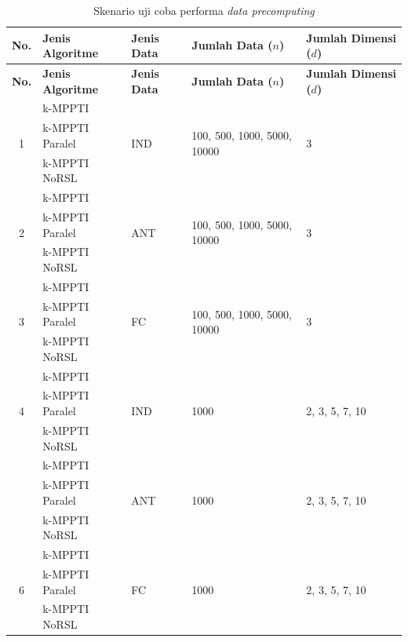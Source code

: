 \begin{longtable}{| c | p{3cm} | p{1cm} | p{2.5cm} | p{1.5cm} |}
	\caption{Skenario uji coba performa \textit{data precomputing} \label{tab:uji-coba-performa-precompute}}\\
	\hline
	\textbf{No.} & \textbf{Jenis Algoritme} & \textbf{Jenis Data} & \textbf{Jumlah Data ($n$)} & \textbf{Jumlah Dimensi ($d$)} \\ \hline
	\endfirsthead
	\hline
	\textbf{No.} & \textbf{Jenis Algoritme} & \textbf{Jenis Data} & \textbf{Jumlah Data ($n$)} & \textbf{Jumlah Dimensi ($d$)} \\ \hline
	\endhead
	\multirow{3}{*}{1} & k-MPPTI & \multirow{3}{1cm}{IND} & \multirow{3}{2.5cm}{100, 500, 1000, 5000, 10000} & \multirow{3}{1.5cm}{3} \\ \cline{2-2} \nopagebreak
	& k-MPPTI Paralel & & & \\ \cline{2-2} \nopagebreak
	& k-MPPTI NoRSL & & & \\ \hline
	\multirow{3}{*}{2} & k-MPPTI & \multirow{3}{1cm}{ANT} & \multirow{3}{2.5cm}{100, 500, 1000, 5000, 10000} & \multirow{3}{1.5cm}{3}\\ \cline{2-2} \nopagebreak
	& k-MPPTI Paralel & & & \\ \cline{2-2} \nopagebreak
	& k-MPPTI NoRSL & & & \\ \hline
	\multirow{3}{*}{3} & k-MPPTI & \multirow{3}{1cm}{FC} & \multirow{3}{2.5cm}{100, 500, 1000, 5000, 10000} & \multirow{3}{1.5cm}{3}\\ \cline{2-2} \nopagebreak
	& k-MPPTI Paralel & & & \\ \cline{2-2} \nopagebreak
	& k-MPPTI NoRSL & & & \\ \hline 
	\multirow{3}{*}{4} & k-MPPTI & \multirow{3}{1cm}{IND} & \multirow{3}{2.5cm}{1000} & \multirow{3}{1.5cm}{2, 3, 5, 7, 10}\\ \cline{2-2}	\nopagebreak	
	& k-MPPTI Paralel & & & \\ \cline{2-2} \nopagebreak
	& k-MPPTI NoRSL & & & \\ \hline \pagebreak
	\multirow{3}{*}{5} & k-MPPTI & \multirow{3}{1cm}{ANT} & \multirow{3}{2.5cm}{1000} & \multirow{3}{1.5cm}{2, 3, 5, 7, 10}\\ \cline{2-2}\nopagebreak
	& k-MPPTI Paralel & & & \\ \cline{2-2} \nopagebreak
	& k-MPPTI NoRSL & & & \\ \hline 
	\multirow{3}{*}{6} & k-MPPTI & \multirow{3}{1cm}{FC} & \multirow{3}{2.5cm}{1000} & \multirow{3}{1.5cm}{2, 3, 5, 7, 10}\\ \cline{2-2} \nopagebreak
	& k-MPPTI Paralel & & & \\ \cline{2-2} \nopagebreak
	& k-MPPTI NoRSL & & & \\ \hline
\end{longtable}

